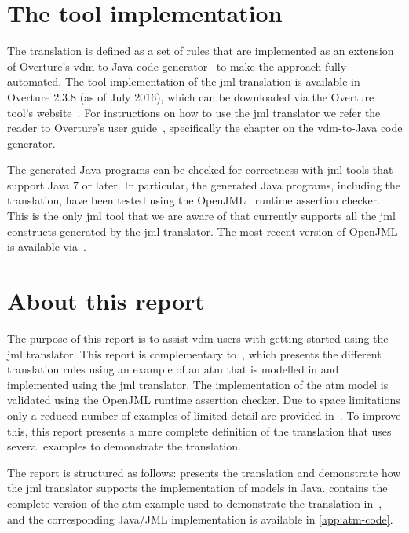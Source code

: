 \section{The tool implementation}

The translation is defined as a set of rules that are implemented as
an extension of Overture's \ac{vdm}-to-Java code
generator~\cite{Jorgensen&14a} to make the approach fully
automated. The tool implementation of the \ac{jml} translation is
available in Overture 2.3.8 (as of July 2016), which can be downloaded
via the Overture tool's website~\cite{OvertureWebsite}. For
instructions on how to use the \ac{jml} translator we refer the reader
to Overture's user guide~\cite{Larsen&10d}, specifically the chapter
on the \ac{vdm}-to-Java code generator.

The generated Java programs can be checked for correctness with
\ac{jml} tools that support Java 7 or later. In particular, the
generated Java programs, including the translation, have been tested
using the OpenJML~\cite{Cok&11} runtime assertion checker. This is the
only \ac{jml} tool that we are aware of that currently supports all
the \ac{jml} constructs generated by the \ac{jml} translator. The most
recent version of OpenJML is available via~\cite{OpenJMLWebsite}.

\section{About this report}

The purpose of this report is to assist \ac{vdm} users with getting
started using the \ac{jml} translator. This report is complementary
to~\cite{Jorgensen&16a}, which presents the different translation
rules using an example of an \ac{atm} that is modelled in \vsl and
implemented using the \ac{jml} translator. The implementation of the
\ac{atm} model is validated using the OpenJML runtime assertion
checker. Due to space limitations only a reduced number of examples of
limited detail are provided in~\cite{Jorgensen&16a}. To improve this,
this report presents a more complete definition of the translation
that uses several examples to demonstrate the translation.

The report is structured as follows:  presents the
translation and demonstrate how the \ac{jml} translator supports the
implementation of \vsl models in Java.  contains
the complete version of the \ac{atm} example used to demonstrate the
translation in~\cite{Jorgensen&16a}, and the corresponding Java/JML
implementation is available in \cref{app:atm-code}.


